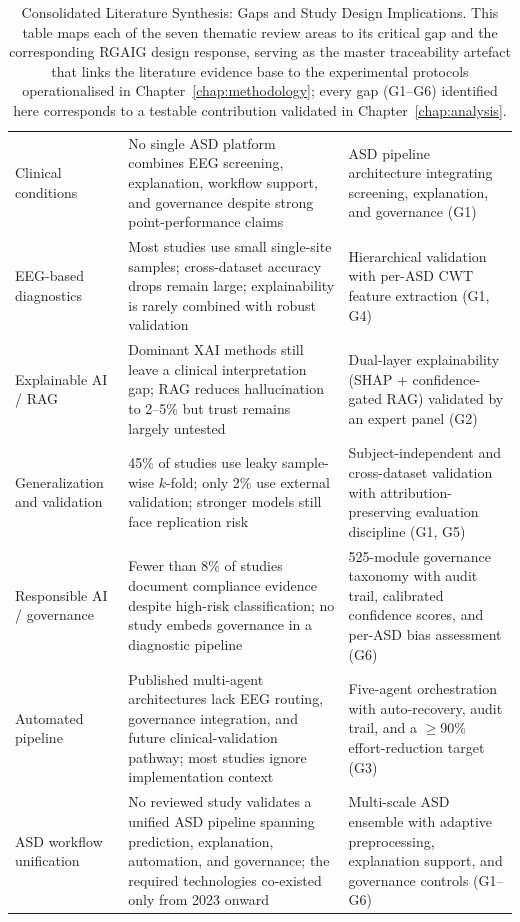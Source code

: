 {\tablestripes\tablefontsize
\begin{xltabular}{\textwidth}{@{} >{\raggedright\arraybackslash}p{2.6cm} p{6.5cm} p{5.3cm} @{}}
\caption[Consolidated Literature Synthesis: Gaps and Study Design]{Consolidated Literature Synthesis: Gaps and Study Design Implications. This table maps each of the seven thematic review areas to its critical gap and the corresponding RGAIG design response, serving as the master traceability artefact that links the literature evidence base to the experimental protocols operationalised in Chapter~\ref{chap:methodology}; every gap (G1--G6) identified here corresponds to a testable contribution validated in Chapter~\ref{chap:analysis}.}\label{tab:lit_synthesis_consolidated} \\
\toprule
{} &  &  \\
\midrule
\endfirsthead
\endhead
\bottomrule
\endlastfoot
Clinical conditions & No single ASD platform combines EEG screening, explanation, workflow support, and governance despite strong point-performance claims & ASD pipeline architecture integrating screening, explanation, and governance (G1) \\
\addlinespace
EEG-based diagnostics & Most studies use small single-site samples; cross-dataset accuracy drops remain large; explainability is rarely combined with robust validation & Hierarchical validation with per-ASD CWT feature extraction (G1, G4) \\
\addlinespace
Explainable AI / RAG & Dominant XAI methods still leave a clinical interpretation gap; RAG reduces hallucination to 2--5\% but trust remains largely untested & Dual-layer explainability (SHAP + confidence-gated RAG) validated by an expert panel (G2) \\
\addlinespace
Generalization and validation & 45\% of studies use leaky sample-wise $k$-fold; only 2\% use external validation; stronger models still face replication risk & Subject-independent and cross-dataset validation with attribution-preserving evaluation discipline (G1, G5) \\
\addlinespace
Responsible AI / governance & Fewer than 8\% of studies document compliance evidence despite high-risk classification; no study embeds governance in a diagnostic pipeline & 525-module governance taxonomy with audit trail, calibrated confidence scores, and per-ASD bias assessment (G6) \\
\addlinespace
Automated pipeline & Published multi-agent architectures lack EEG routing, governance integration, and future clinical-validation pathway; most studies ignore implementation context & Five-agent orchestration with auto-recovery, audit trail, and a $\geq$90\% effort-reduction target (G3) \\
\addlinespace
ASD workflow unification & No reviewed study validates a unified ASD pipeline spanning prediction, explanation, automation, and governance; the required technologies co-existed only from 2023 onward & Multi-scale ASD ensemble with adaptive preprocessing, explanation support, and governance controls (G1--G6) \\
\end{xltabular}}
